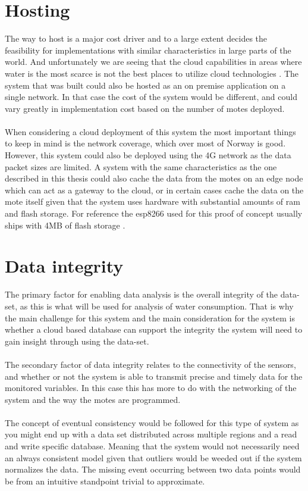 \documentclass[]{uiophd}
\begin{document}
\section{Hosting}
The way to host is a major cost driver and to a large extent decides the feasibility for implementations with similar characteristics in large parts of the world. And unfortunately we are seeing that the cloud capabilities in areas where water is the most scarce is not the best places to utilize cloud technologies \cite{awsregions}. The system that was built could also be hosted as an on premise application on a single network. In that case the cost of the system would be different, and could vary greatly in implementation cost based on the number of motes deployed.
\\\\
When considering a cloud deployment of this system the most important things to keep in mind is the network coverage, which over most of Norway is good. However, this system could also be deployed using the 4G network as the data packet sizes are limited. A system with the same characteristics as the one described in this thesis could also cache the data from the motes on an edge node which can act as a gateway to the cloud, or in certain cases cache the data on the mote itself given that the system uses hardware with substantial amounts of ram and flash storage. For reference the esp8266 used for this proof of concept usually ships with 4MB of flash storage \cite{espressif}.

\section{Data integrity}
The primary factor for enabling data analysis is the overall integrity of the data-set, as this is what will be used for analysis of water consumption. That is why the main challenge for this system and the main consideration for the system is whether a cloud based database can support the integrity the system will need to gain insight through using the data-set. 
\\\\
The secondary factor of data integrity relates to the connectivity of the sensors, and whether or not the system is able to transmit precise and timely data for the monitored variables. In this case this has  more to do with the networking of the system and the way the motes are programmed.
\\\\
The concept of eventual consistency would be followed for this type of system as you might end up with a data set distributed across multiple regions and a read and write specific database. Meaning that the system would not necessarily need an always consistent model given that outliers would be weeded out if the system normalizes the data. The missing event occurring between two data points would be from an intuitive standpoint trivial to approximate.
\end{document}
